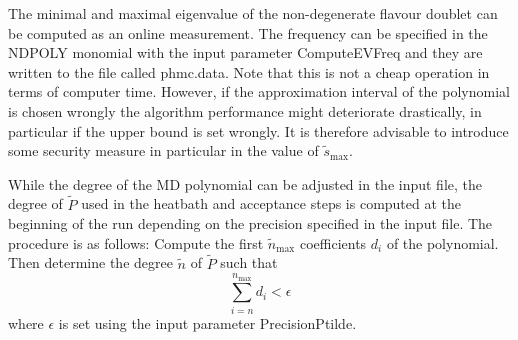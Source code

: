 The minimal and maximal eigenvalue of the non-degenerate flavour
doublet can be computed as an online measurement. The frequency can be
specified in the {\ttfamily NDPOLY} monomial with the input parameter
{\ttfamily ComputeEVFreq} and they are written to the file called
{\ttfamily phmc.data}. Note that this is not a cheap operation in
terms of computer time. However, if the approximation interval of the
polynomial is chosen wrongly the algorithm performance might
deteriorate drastically, in particular if the upper bound is set
wrongly. It is therefore advisable to introduce some security measure
in particular in the value of $\tilde s_\mathrm{max}$. 

While the degree of the MD polynomial can be adjusted in the input
file, the degree of $\tilde P$ used in the heatbath and acceptance
steps is computed at the beginning of the run depending on the
precision specified in the input file. The procedure is as
follows: Compute the first $\tilde n_\mathrm{max}$
coefficients $d_i$ of the polynomial. Then determine the degree
$\tilde n$ of $\tilde P$ such that 
\[
\sum_{i=n}^{n_\mathrm{max}} d_i < \epsilon
\]
where $\epsilon$ is set using the input parameter {\ttfamily
  PrecisionPtilde}. 

